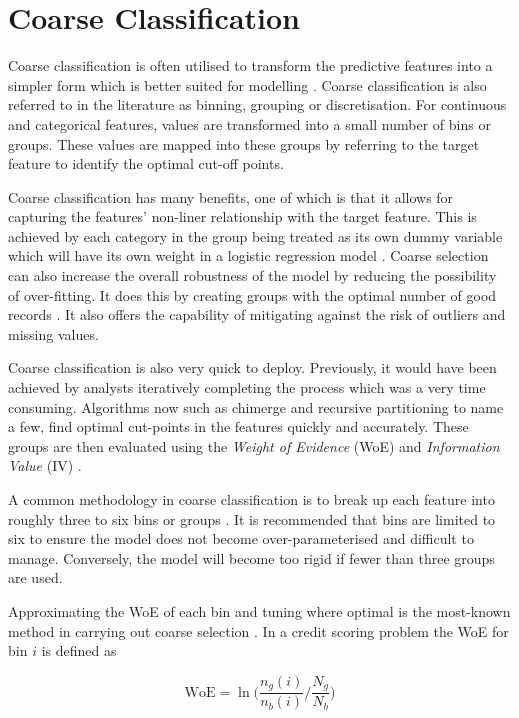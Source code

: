 \section{Coarse Classification} \label{sec:binning}
Coarse classification is often utilised to transform the predictive features into a simpler form which is better suited for modelling \citep{carroll_transformation_1988}. Coarse classification is also referred to in the literature as binning, grouping or discretisation. For continuous and categorical features, values are transformed into a small number of bins or groups. These values  are mapped into these groups by referring to the target feature to identify the optimal cut-off points. 

Coarse classification has many benefits, one of which is that it allows for capturing the features' non-liner relationship with the target feature. This is achieved by each category in the group being treated as its own dummy variable which will have its own weight in a logistic regression model \citep{hand_optimal_2005}. Coarse selection can also increase the overall robustness of the model by reducing the possibility of over-fitting. It does this by creating groups with the optimal number of good records \citep{baesens_50_2009}. It also offers the capability of mitigating against the risk of outliers and missing values. 

Coarse classification is also very quick to deploy. Previously, it would have been achieved by analysts iteratively completing the process which was a very time consuming. Algorithms now such as chimerge and recursive partitioning to name a few, find optimal cut-points in the features quickly and accurately. These groups are then evaluated using the \textit{Weight of Evidence} (WoE) and \textit{Information Value} (IV) \citep{garcia_survey_2013}. 

A common methodology in coarse classification is to break up each feature into roughly three to six bins or groups \citep{hand_optimal_2005}. It is recommended that bins are limited to six to ensure the model does not become over-parameterised and difficult to manage. Conversely, the model will become too rigid if fewer than three groups are used. 

Approximating the WoE of each bin and tuning where optimal is the most-known method in carrying out coarse selection \citep{thomas_consumer_2009}. In a credit scoring problem the WoE for bin $i$ is defined as 
  
\begin{equation} \label{eq:woe}
\text{WoE} =  \ln\bigg(\frac{n_g(i)}{n_b(i)} \bigg/ \frac{N_g}{N_b}\bigg)
\end{equation}

